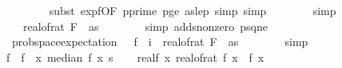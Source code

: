 \begin{isabellebody}
\ \ \ \ \ \ \ \isamarkupfalse%
\ {\isacharparenleft}{\kern0pt}subst\ exp{\isacharunderscore}{\kern0pt}f{}{\isacharbrackleft}{\kern0pt}OF\ p{\isacharunderscore}{\kern0pt}prime\ p{\isacharunderscore}{\kern0pt}ge{\isacharunderscore}{\kern0pt}{}\ as{\isacharunderscore}{\kern0pt}le{\isacharunderscore}{\kern0pt}p{\isacharbrackright}{\kern0pt}{\isacharcomma}{\kern0pt}\ simp{\isacharcomma}{\kern0pt}\ simp{\isacharparenright}{\kern0pt}\isanewline
\ \ \ \ \ \ \isamarkupfalse%
\ simp\isanewline
\ \ \ \ \isamarkupfalse%
\ \isamarkupfalse%
\ {\isachardoublequoteopen}{\isachardot}{\kern0pt}{\isachardot}{\kern0pt}{\isachardot}{\kern0pt}\ {\isacharequal}{\kern0pt}\ \ real{\isacharunderscore}{\kern0pt}of{\isacharunderscore}{\kern0pt}rat\ {\isacharparenleft}{\kern0pt}F\ {}\ as{\isacharparenright}{\kern0pt}{\isachardoublequoteclose}\isanewline
\ \ \ \ \ \ \isamarkupfalse%
\ {\isacharparenleft}{\kern0pt}simp\ add{\isacharcolon}{\kern0pt}s{}{\isacharunderscore}{\kern0pt}nonzero\ p{\isacharunderscore}{\kern0pt}sq{\isacharunderscore}{\kern0pt}ne{\isacharunderscore}{\kern0pt}{}{\isacharparenright}{\kern0pt}\isanewline
\ \ \ \ \isamarkupfalse%
\ \isamarkupfalse%
\ {\isachardoublequoteopen}\ prob{\isacharunderscore}{\kern0pt}space{\isachardot}{\kern0pt}expectation\ {\isasymOmega}\ {\isacharparenleft}{\kern0pt}{\isasymlambda}{\isasymomega}{\isachardot}{\kern0pt}\ f{}\ {\isasymomega}\ i{\isacharparenright}{\kern0pt}\ {\isacharequal}{\kern0pt}\ real{\isacharunderscore}{\kern0pt}of{\isacharunderscore}{\kern0pt}rat\ {\isacharparenleft}{\kern0pt}F\ {}\ as{\isacharparenright}{\kern0pt}{\isachardoublequoteclose}\isanewline
\ \ \ \ \ \ \isamarkupfalse%
\ simp\isanewline
\ \ \isamarkupfalse%
\isanewline
\isanewline
\ \ \isamarkupfalse%
\ f{\isacharprime}{\kern0pt}\ \ {\isachardoublequoteopen}f{\isacharprime}{\kern0pt}\ {\isacharequal}{\kern0pt}\ {\isacharparenleft}{\kern0pt}{\isasymlambda}x{\isachardot}{\kern0pt}\ median\ {\isacharparenleft}{\kern0pt}f{}\ x{\isacharparenright}{\kern0pt}\ s\isanewline
\ \ \isamarkupfalse%
\ real{\isacharunderscore}{\kern0pt}f{\isacharcolon}{\kern0pt}\ {\isachardoublequoteopen}{\isasymAnd}x{\isachardot}{\kern0pt}\ real{\isacharunderscore}{\kern0pt}of{\isacharunderscore}{\kern0pt}rat\ {\isacharparenleft}{\kern0pt}f\ x{\isacharparenright}{\kern0pt}\ {\isacharequal}{\kern0pt}\ f{\isacharprime}{\kern0pt}\ x{\isachardoublequoteclose}\isanewline

\end{isabellebody}
